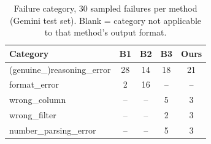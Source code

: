 \begin{table}[t]
\centering
\caption{Failure category, 30 sampled failures per method (Gemini test set). Blank = category not applicable to that method's output format.}
\label{tab:error-categories}
\footnotesize
\begin{tabular}{lcccc}
\toprule
Category & B1 & B2 & B3 & Ours \\
\midrule
(genuine\_)reasoning\_error & 28 & 14 & 18 & 21 \\
format\_error & 2 & 16 & -- & -- \\
wrong\_column & -- & -- & 5 & 3 \\
wrong\_filter & -- & -- & 2 & 3 \\
number\_parsing\_error & -- & -- & 5 & 3 \\
\bottomrule
\end{tabular}
\end{table}
